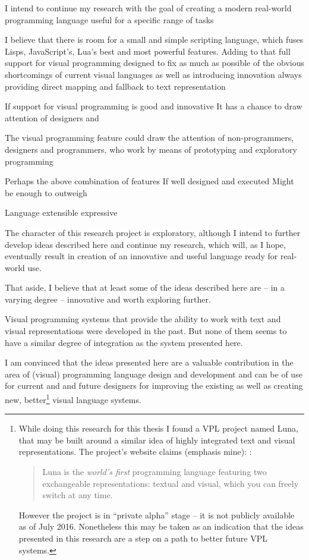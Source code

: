 I intend to continue my research with the goal of creating a modern real-world
programming language useful for a specific range of tasks

I believe that there is room for a small and simple scripting language, which fuses Lisps, JavaScript's, Lua's best and most powerful features. Adding to that full support for visual programming designed to fix as much as possible of the obvious shortcomings of current visual languages as well as introducing innovation always providing direct mapping and fallback to text representation  

If support for visual programming is good and innovative
It has a chance to draw attention of designers and 

The visual programming feature could draw the attention of non-programmers, designers and programmers, who work by means of prototyping and exploratory programming

Perhaps the above combination of features
If well designed and executed
Might be enough to outweigh \cite{pl_checklist}



Language
    extensible
    expressive
    


The character of this research project is exploratory, although I intend to
further develop ideas described here and continue my research, which will, as I
hope, eventually result in creation of an innovative and useful language ready
for real-world use.

That aside, I believe that at least some of the ideas described here are -- in a
varying degree -- innovative and worth exploring further.


Visual programming systems that provide the ability to work with text and visual representations were developed in the past\cite{snapshots}. But none of them seems to have a similar degree of integration as the system presented here.

I am convinced that the ideas presented here are a valuable contribution in the area of (visual) programming language design and development and can be of use for current and and future designers for improving the existing as well as creating new, better\footnote{
While doing this research for this thesis I found a VPL project named Luna, that may be built around a similar idea of highly integrated text and visual representations. The project's website claims (emphasis mine):
\cite{luna_website}:
\begin{quote}
Luna is the \textit{world’s first} programming language featuring two exchangeable representations: textual and visual, which you can freely switch at any time.
\end{quote}

However the project is in ``private alpha'' stage -- it is not publicly available as of July 2016. Nonetheless this may be taken as an indication that the ideas presented in this research are a step on a path to better future VPL systems.
} visual language systems.